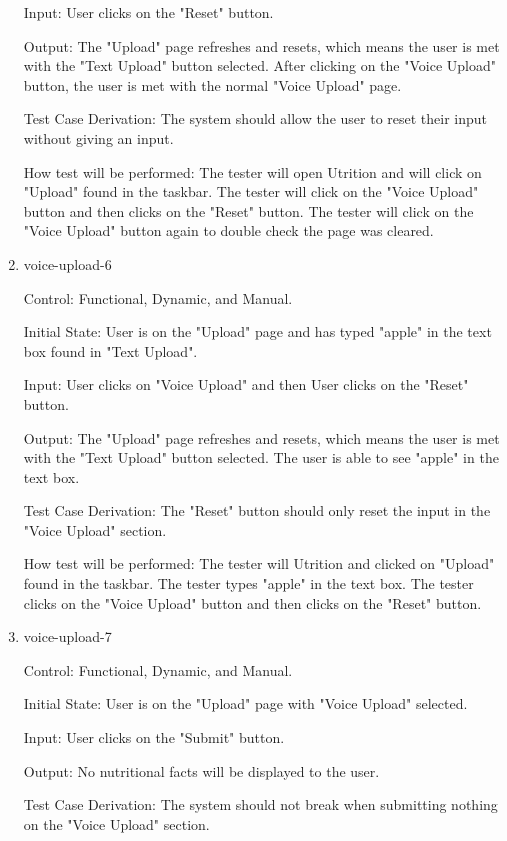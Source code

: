 \documentclass[12pt, titlepage]{article}
\begin{document}
\begin{enumerate}
	Input: User clicks on the "Reset" button.
	
	Output: The "Upload" page refreshes and resets, which means the user is met with the "Text Upload" button selected. After clicking on the "Voice Upload" button, the user is met with the normal "Voice Upload" page.
	
	Test Case Derivation: The system should allow the user to reset their input without giving an input.
	
	How test will be performed: The tester will open Utrition and will click on "Upload" found in the taskbar. The tester will click on the "Voice Upload" button and then clicks on the "Reset" button. The tester will click on the "Voice Upload" button again to double check the page was cleared. 
	
	\item{voice-upload-6\\}
	
	Control: Functional, Dynamic, and Manual.
	
	Initial State: User is on the "Upload" page and has typed "apple" in the text box found in "Text Upload".
	
	Input: User clicks on "Voice Upload" and then User clicks on the "Reset" button.
	
	Output: The "Upload" page refreshes and resets, which means the user is met with the "Text Upload" button selected. The user is able to see "apple" in the text box.
	
	Test Case Derivation: The "Reset" button should only reset the input in the "Voice Upload" section.
	
	How test will be performed: The tester will Utrition and clicked on "Upload" found in the taskbar. The tester types "apple" in the text box. The tester clicks on the "Voice Upload" button and then clicks on the "Reset" button.
	
	\item{voice-upload-7\\}
	
	Control: Functional, Dynamic, and Manual.
	
	Initial State: User is on the "Upload" page with "Voice Upload" selected.
	
	Input: User clicks on the "Submit" button.
	
	Output: No nutritional facts will be displayed to the user.
	
	Test Case Derivation: The system should not break when submitting nothing on the "Voice Upload" section.
	

\end{enumerate}
\end{document}
